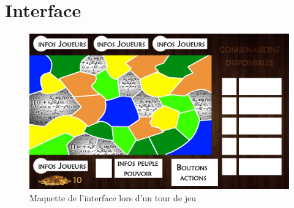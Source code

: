 \documentclass[a4paper]{report}
\begin{document}
\section{Interface}
\begin{figure}[H]
    \begin{center}
        \includegraphics[width=0.85\textheight,angle=90]{plateau.jpg}
        \caption{Maquette de l'interface lors d'un tour de jeu}
   \end{center}
\end{figure}
\end{document}
